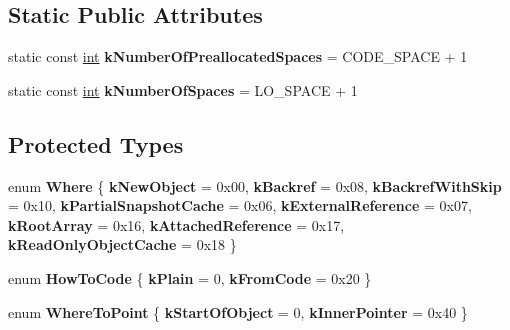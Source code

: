 \subsection*{Static Public Attributes}
\begin{DoxyCompactItemize}
\item 
\mbox{\label{classv8_1_1internal_1_1SerializerDeserializer_aaed98bc38a78b739bf9bfefbf958d6c2}} 
static const \mbox{\hyperlink{classint}{int}} {\bfseries k\+Number\+Of\+Preallocated\+Spaces} = C\+O\+D\+E\+\_\+\+S\+P\+A\+CE + 1
\item 
\mbox{\label{classv8_1_1internal_1_1SerializerDeserializer_a6daa032c293e99bdf9f7d66d8365f556}} 
static const \mbox{\hyperlink{classint}{int}} {\bfseries k\+Number\+Of\+Spaces} = L\+O\+\_\+\+S\+P\+A\+CE + 1
\end{DoxyCompactItemize}
\subsection*{Protected Types}
\begin{DoxyCompactItemize}
\item 
\mbox{\label{classv8_1_1internal_1_1SerializerDeserializer_a338d50f92903ec056650135e60139c8a}} 
enum {\bfseries Where} \{ \newline
{\bfseries k\+New\+Object} = 0x00, 
{\bfseries k\+Backref} = 0x08, 
{\bfseries k\+Backref\+With\+Skip} = 0x10, 
{\bfseries k\+Partial\+Snapshot\+Cache} = 0x06, 
\newline
{\bfseries k\+External\+Reference} = 0x07, 
{\bfseries k\+Root\+Array} = 0x16, 
{\bfseries k\+Attached\+Reference} = 0x17, 
{\bfseries k\+Read\+Only\+Object\+Cache} = 0x18
 \}
\item 
\mbox{\label{classv8_1_1internal_1_1SerializerDeserializer_a3806541ecf89447911d72c6ccd7bb43e}} 
enum {\bfseries How\+To\+Code} \{ {\bfseries k\+Plain} = 0, 
{\bfseries k\+From\+Code} = 0x20
 \}
\item 
\mbox{\label{classv8_1_1internal_1_1SerializerDeserializer_ab62aa66a8d8e959c1d118dbec6d921b6}} 
enum {\bfseries Where\+To\+Point} \{ {\bfseries k\+Start\+Of\+Object} = 0, 
{\bfseries k\+Inner\+Pointer} = 0x40
 \}
\end{DoxyCompactItemize}
